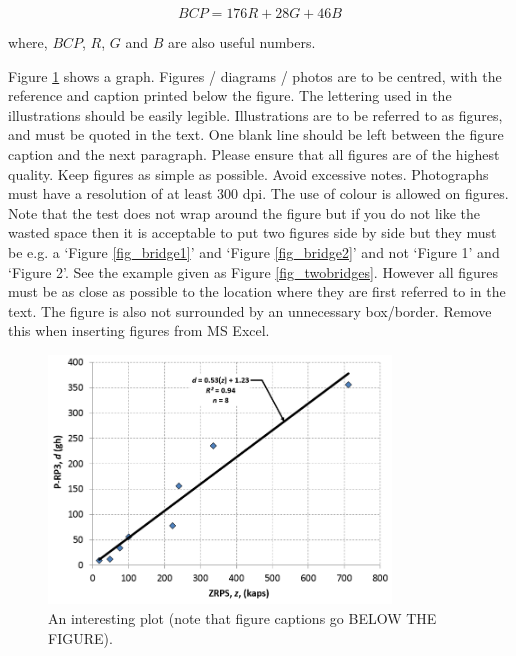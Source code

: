 \documentclass[a4paper,10pt]{article}
\begin{document}
\begin{equation}
BCP = 176R+28G+46B
\end{equation}

where, $BCP$, $R$, $G$ and $B$ are also useful numbers.

Figure \ref{fig_regression} shows a graph.  Figures / diagrams / photos are to be centred, with the reference and caption printed below the figure. The lettering used in the illustrations should be easily legible.  Illustrations are to be referred to as figures, and must be quoted in the text. One blank line should be left between the figure caption and the next paragraph. Please ensure that all figures are of the highest quality. Keep figures as simple as possible. Avoid excessive notes. Photographs must have a resolution of at least 300 dpi. The use of colour is allowed on figures. Note that the test does not wrap around the figure but if you do not like the wasted space then it is acceptable to put two figures side by side but they must be e.g. a ‘Figure \ref{fig_bridge1}’ and ‘Figure \ref{fig_bridge2}’ and not ‘Figure 1’ and ‘Figure 2’. See the example given as Figure \ref{fig_twobridges}. However all figures must be as close as possible to the location where they are first referred to in the text. The figure is also not surrounded by an unnecessary box/border. Remove this when inserting figures from MS Excel.


\begin{figure}[ht]
\centering
\includegraphics[height=6.6cm]{figures/fig_regression}
\caption{An interesting plot (note that figure captions go BELOW THE FIGURE).}
\label{fig_regression}
\end{figure}
\end{document}
